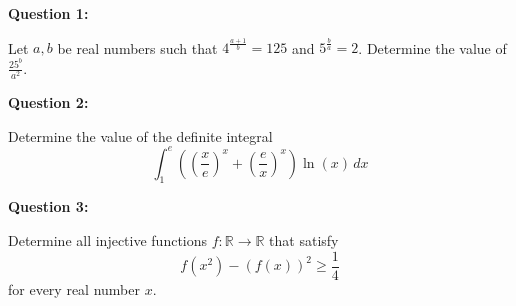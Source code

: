 \documentclass{article}
\begin{document}
	
	\noindent \textbf{Question 1:}
	
	Let \( a, b \) be real numbers such that \( 4^{\frac{a+1}{b}} = 125 \) and \( 5^{\frac{b}{a}} = 2 \). Determine the value of \( \frac{25^b}{a^2} \).
	
	\vspace{1em}
	
	\noindent \textbf{Question 2:}
	
	Determine the value of the definite integral
	\[ \int_{1}^{e} \left( \left(\frac{x}{e}\right)^x + \left(\frac{e}{x}\right)^x \right) \ln(x) \, dx \]
	
	\vspace{1em}
	
	\noindent \textbf{Question 3:}
	
	Determine all injective functions \( f: \mathbb{R} \to \mathbb{R} \) that satisfy 
	\[ f(x^2) - (f(x))^2 \geq \frac{1}{4} \]
	for every real number \( x \).
	
\end{document}
